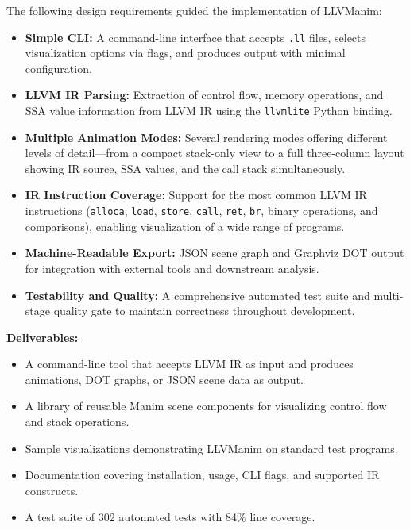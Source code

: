 The following design requirements guided the implementation of LLVManim:

\begin{itemize}
  \item \textbf{Simple CLI:} A command-line interface that accepts \texttt{.ll} files, selects visualization options via flags, and produces output with minimal configuration.

  \item \textbf{LLVM IR Parsing:} Extraction of control flow, memory operations, and SSA value information from LLVM IR using the \texttt{llvmlite}\cite{llvmlite} Python binding.

  \item \textbf{Multiple Animation Modes:} Several rendering modes offering different levels of detail---from a compact stack-only view to a full three-column layout showing IR source, SSA values, and the call stack simultaneously.

  \item \textbf{IR Instruction Coverage:} Support for the most common LLVM IR instructions (\texttt{alloca}, \texttt{load}, \texttt{store}, \texttt{call}, \texttt{ret}, \texttt{br}, binary operations, and comparisons), enabling visualization of a wide range of programs.

  \item \textbf{Machine-Readable Export:} JSON scene graph and Graphviz DOT output for integration with external tools and downstream analysis.

  \item \textbf{Testability and Quality:} A comprehensive automated test suite and multi-stage quality gate to maintain correctness throughout development.
\end{itemize}

\textbf{Deliverables:}
\begin{itemize}
  \item A command-line tool that accepts LLVM IR as input and produces animations, DOT graphs, or JSON scene data as output.
  \item A library of reusable Manim scene components for visualizing control flow and stack operations.
  \item Sample visualizations demonstrating LLVManim on standard test programs.
  \item Documentation covering installation, usage, CLI flags, and supported IR constructs.
  \item A test suite of 302 automated tests with 84\% line coverage.
\end{itemize}
